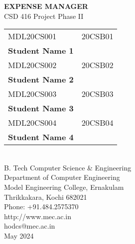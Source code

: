 \thispagestyle{empty}
\begin{center}
{\Large \textbf{EXPENSE MANAGER}}\\[0.5cm]
{\large CSD 416 Project Phase II}\\[2cm]

\begin{tabular}{ll}
MDL20CS001 & 20CSB01 \\
\textbf{Student Name 1} & \\
MDL20CS002 & 20CSB02 \\
\textbf{Student Name 2} & \\
MDL20CS003 & 20CSB03 \\
\textbf{Student Name 3} & \\
MDL20CS004 & 20CSB04 \\
\textbf{Student Name 4} & \\
\end{tabular}\\[1cm]

{\large B. Tech Computer Science \& Engineering}\\[2cm]

{\large Department of Computer Engineering}\\[0.5cm]
{\large Model Engineering College, Ernakulam}\\[0.5cm]
{\large Thrikkakara, Kochi 682021}\\[0.5cm]
{\large Phone: +91.484.2575370}\\[0.5cm]
{\large http://www.mec.ac.in}\\[0.5cm]
{\large hodcs@mec.ac.in}\\[2cm]

{\large May 2024}
\end{center}